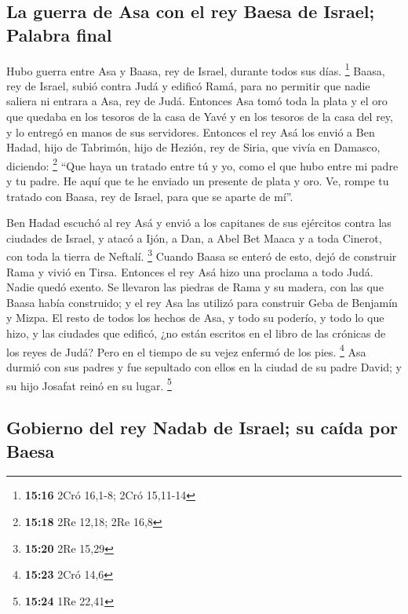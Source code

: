 \begin{paracol}{2}
\hypertarget{la-guerra-de-asa-con-el-rey-baesa-de-israel-palabra-final}{%
\subsection{La guerra de Asa con el rey Baesa de Israel; Palabra
final}\label{la-guerra-de-asa-con-el-rey-baesa-de-israel-palabra-final}}

 Hubo guerra entre Asa y Baasa, rey de Israel, durante
todos sus días. \footnote{\textbf{15:16} 2Cró 16,1-8; 2Cró 15,11-14}
 Baasa, rey de Israel, subió contra Judá y edificó Ramá,
para no permitir que nadie saliera ni entrara a Asa, rey de Judá.
 Entonces Asa tomó toda la plata y el oro que quedaba en
los tesoros de la casa de Yavé y en los tesoros de la casa del rey, y lo
entregó en manos de sus servidores. Entonces el rey Asá los envió a Ben
Hadad, hijo de Tabrimón, hijo de Hezión, rey de Siria, que vivía en
Damasco, diciendo: \footnote{\textbf{15:18} 2Re 12,18; 2Re 16,8}
 ``Que haya un tratado entre tú y yo, como el que hubo
entre mi padre y tu padre. He aquí que te he enviado un presente de
plata y oro. Ve, rompe tu tratado con Baasa, rey de Israel, para que se
aparte de mí''.

 Ben Hadad escuchó al rey Asá y envió a los capitanes de
sus ejércitos contra las ciudades de Israel, y atacó a Ijón, a Dan, a
Abel Bet Maaca y a toda Cinerot, con toda la tierra de Neftalí.
\footnote{\textbf{15:20} 2Re 15,29}  Cuando Baasa se
enteró de esto, dejó de construir Rama y vivió en Tirsa. 
Entonces el rey Asá hizo una proclama a todo Judá. Nadie quedó exento.
Se llevaron las piedras de Rama y su madera, con las que Baasa había
construido; y el rey Asa las utilizó para construir Geba de Benjamín y
Mizpa.  El resto de todos los hechos de Asa, y todo su
poderío, y todo lo que hizo, y las ciudades que edificó, ¿no están
escritos en el libro de las crónicas de los reyes de Judá? Pero en el
tiempo de su vejez enfermó de los pies. \footnote{\textbf{15:23} 2Cró
  14,6}  Asa durmió con sus padres y fue sepultado con
ellos en la ciudad de su padre David; y su hijo Josafat reinó en su
lugar. \footnote{\textbf{15:24} 1Re 22,41}

\hypertarget{gobierno-del-rey-nadab-de-israel-su-cauxedda-por-baesa}{%
\subsection{Gobierno del rey Nadab de Israel; su caída por
Baesa}\label{gobierno-del-rey-nadab-de-israel-su-cauxedda-por-baesa}}


\end{paracol}
